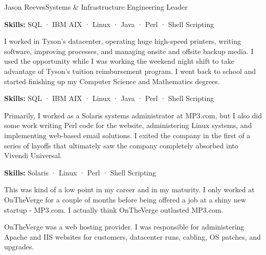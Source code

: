 \documentclass{article}
\begin{document}
\begin{cv}{Jason Reeves}{Systems \& Infrastructure Engineering Leader}
\begin{cvevent}[Sep 2004][Sep 2005]
  \textbf{Skills:} SQL · IBM AIX · Linux · Java · Perl · Shell Scripting
  \vspace*{5mm}
\end{cvevent}

\begin{cvevent}[Sep 2001][Sep 2004]
  I worked in Tyson's datacenter, operating huge high-speed printers, writing software, improving processes, and managing onsite and offsite backup media. I used the opportunity while I was working the weekend night shift to take advantage of Tyson's tuition reimbursement program. I went back to school and started finishing up my Computer Science and Mathematics degrees.
  \vspace*{3mm}
  
  \textbf{Skills:} SQL · IBM AIX · Linux · Java · Perl · Shell Scripting
  \vspace*{5mm}
\end{cvevent}

\begin{cvevent}[May 2000][Jan 2001]
  Primarily, I worked as a Solaris systems administrator at MP3.com, but I also did some work writing Perl code for the website, administering Linux systems, and implementing web-based email solutions. I exited the company in the first of a series of layoffs that ultimately saw the company completely absorbed into Vivendi Universal.
  \vspace*{3mm}
  
  \textbf{Skills:} Solaris · Linux · Perl · Shell Scripting
  \vspace*{5mm}
\end{cvevent}

\begin{cvevent}[Mar 2000][May 2000]
  This was kind of a low point in my career and in my maturity. I only worked at OnTheVerge for a couple of months before being offered a job at a shiny new startup - MP3.com. I actually think OnTheVerge outlasted MP3.com. 
  \vspace*{3mm}
  
  OnTheVerge was a web hosting provider. I was responsible for administering Apache and IIS websites for customers, datacenter runs, cabling, OS patches, and upgrades.
  \vspace*{3mm}
  

\end{cvevent}
\end{cv}
\end{document}
